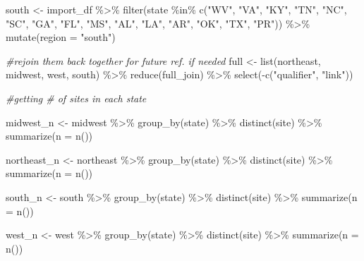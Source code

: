 \documentclass[12pt, twoside]{amherstthesis}
\newenvironment{Shaded}{\begin{snugshade}}{\end{snugshade}}
\newcommand{\AttributeTok}[1]{\textcolor[rgb]{0.77,0.63,0.00}{#1}}
\newcommand{\CommentTok}[1]{\textcolor[rgb]{0.56,0.35,0.01}{\textit{#1}}}
\newcommand{\FunctionTok}[1]{\textcolor[rgb]{0.00,0.00,0.00}{#1}}
\newcommand{\NormalTok}[1]{#1}
\newcommand{\OtherTok}[1]{\textcolor[rgb]{0.56,0.35,0.01}{#1}}
\newcommand{\SpecialCharTok}[1]{\textcolor[rgb]{0.00,0.00,0.00}{#1}}
\newcommand{\StringTok}[1]{\textcolor[rgb]{0.31,0.60,0.02}{#1}}
\begin{document}
\begin{Shaded}
\begin{Highlighting}[]
\NormalTok{south }\OtherTok{\textless{}{-}}\NormalTok{ import\_df }\SpecialCharTok{\%\textgreater{}\%}
  \FunctionTok{filter}\NormalTok{(state }\SpecialCharTok{\%in\%} \FunctionTok{c}\NormalTok{(}\StringTok{"WV"}\NormalTok{, }\StringTok{"VA"}\NormalTok{, }\StringTok{"KY"}\NormalTok{, }\StringTok{"TN"}\NormalTok{, }\StringTok{"NC"}\NormalTok{, }\StringTok{"SC"}\NormalTok{, }\StringTok{"GA"}\NormalTok{, }
                      \StringTok{"FL"}\NormalTok{, }\StringTok{"MS"}\NormalTok{, }\StringTok{"AL"}\NormalTok{, }\StringTok{"LA"}\NormalTok{, }\StringTok{"AR"}\NormalTok{, }\StringTok{"OK"}\NormalTok{, }\StringTok{"TX"}\NormalTok{, }\StringTok{"PR"}\NormalTok{)) }\SpecialCharTok{\%\textgreater{}\%}
  \FunctionTok{mutate}\NormalTok{(}\AttributeTok{region =} \StringTok{"south"}\NormalTok{)}

\CommentTok{\#rejoin them back together for future ref. if needed}
\NormalTok{full }\OtherTok{\textless{}{-}} \FunctionTok{list}\NormalTok{(northeast, midwest, west, south) }\SpecialCharTok{\%\textgreater{}\%} 
  \FunctionTok{reduce}\NormalTok{(full\_join) }\SpecialCharTok{\%\textgreater{}\%}
  \FunctionTok{select}\NormalTok{(}\SpecialCharTok{{-}}\FunctionTok{c}\NormalTok{(}\StringTok{"qualifier"}\NormalTok{, }\StringTok{"link"}\NormalTok{))}

\CommentTok{\#getting \# of sites in each state}

\NormalTok{midwest\_n }\OtherTok{\textless{}{-}}\NormalTok{ midwest }\SpecialCharTok{\%\textgreater{}\%}
  \FunctionTok{group\_by}\NormalTok{(state) }\SpecialCharTok{\%\textgreater{}\%}
  \FunctionTok{distinct}\NormalTok{(site) }\SpecialCharTok{\%\textgreater{}\%}
  \FunctionTok{summarize}\NormalTok{(}\AttributeTok{n =} \FunctionTok{n}\NormalTok{())}

\NormalTok{northeast\_n }\OtherTok{\textless{}{-}}\NormalTok{ northeast }\SpecialCharTok{\%\textgreater{}\%}
  \FunctionTok{group\_by}\NormalTok{(state) }\SpecialCharTok{\%\textgreater{}\%}
  \FunctionTok{distinct}\NormalTok{(site) }\SpecialCharTok{\%\textgreater{}\%}
  \FunctionTok{summarize}\NormalTok{(}\AttributeTok{n =} \FunctionTok{n}\NormalTok{())}

\NormalTok{south\_n }\OtherTok{\textless{}{-}}\NormalTok{ south }\SpecialCharTok{\%\textgreater{}\%}
  \FunctionTok{group\_by}\NormalTok{(state) }\SpecialCharTok{\%\textgreater{}\%}
  \FunctionTok{distinct}\NormalTok{(site) }\SpecialCharTok{\%\textgreater{}\%}
  \FunctionTok{summarize}\NormalTok{(}\AttributeTok{n =} \FunctionTok{n}\NormalTok{())}

\NormalTok{west\_n }\OtherTok{\textless{}{-}}\NormalTok{ west }\SpecialCharTok{\%\textgreater{}\%}
  \FunctionTok{group\_by}\NormalTok{(state) }\SpecialCharTok{\%\textgreater{}\%}
  \FunctionTok{distinct}\NormalTok{(site) }\SpecialCharTok{\%\textgreater{}\%}
  \FunctionTok{summarize}\NormalTok{(}\AttributeTok{n =} \FunctionTok{n}\NormalTok{())}


\end{Highlighting}
\end{Shaded}
\end{document}

